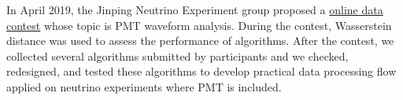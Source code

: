 \acknowledgments
In April 2019, the Jinping Neutrino Experiment group proposed a \href{https://mp.weixin.qq.com/s?__biz=MzA4MTAwMzgzOA==&mid=2650872289&idx=2&sn=48145a6598545d201f940e0459de99dd&chksm=846e2db0b319a4a627e902d0d6ed4b9d968225566021342c5935764963f352fbe02db1bdb333&mpshare=1&scene=1&srcid=0307c4HOvK0ChJUcq9blC3ub%23rd}{online data contest} whose topic is PMT waveform analysis. During the contest, Wasserstein distance was used to assess the performance of algorithms. After the contest, we collected several algorithms submitted by participants and we checked, redesigned, and tested these algorithms to develop practical data processing flow applied on neutrino experiments where PMT is included. 

